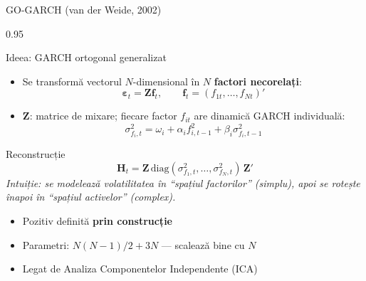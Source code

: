 \documentclass[9pt, aspectratio=169, t]{beamer}
\begin{document}
\begin{frame}{GO-GARCH (van der Weide, 2002)}
    \begin{cminipage}{0.95\textwidth}
    \vspace{-1mm}
    {\footnotesize
    \begin{block}{Ideea: GARCH ortogonal generalizat}
        \begin{itemize}\setlength{\itemsep}{0pt}
            \item Se transformă vectorul $N$-dimensional în $N$ \textbf{factori necorelați}:
            \[
                \boldsymbol{\varepsilon}_t = \mathbf{Z}\mathbf{f}_t, \qquad \mathbf{f}_t = (f_{1t}, \ldots, f_{Nt})'
            \]
            \item $\mathbf{Z}$: matrice de mixare; fiecare factor $f_{it}$ are dinamică GARCH individuală:
            \[
                \sigma_{f_i,t}^2 = \omega_i + \alpha_i f_{i,t-1}^2 + \beta_i \sigma_{f_i,t-1}^2
            \]
        \end{itemize}
    \end{block}
    \begin{block}{Reconstrucție}
        \[
            \mathbf{H}_t = \mathbf{Z}\,\text{diag}(\sigma_{f_1,t}^2, \ldots, \sigma_{f_N,t}^2)\,\mathbf{Z}'
        \]
        \textit{Intuiție: se modelează volatilitatea în ``spațiul factorilor'' (simplu), apoi se rotește înapoi în ``spațiul activelor'' (complex).}
        \begin{itemize}\setlength{\itemsep}{0pt}
            \item Pozitiv definită \textbf{prin construcție}
            \item Parametri: $N(N-1)/2 + 3N$ --- scalează bine cu $N$
            \item Legat de Analiza Componentelor Independente (ICA)
        \end{itemize}
    \end{block}
    }
    \end{cminipage}
\end{frame}
\end{document}
